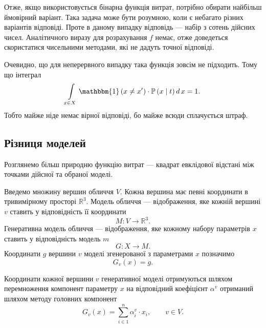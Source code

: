 Отже, якщо використовується бінарна функція витрат,
потрібно обирати найбільш ймовірний варіант.
Така задача може бути розумною, коли є небагато різних варіантів відповіді.
Проте в даному випадку відповідь --- набір з сотень дійсних чисел.
Аналітичного виразу для розрахування $f$ немає,
отже доведеться скористатися чисельними методами,
які не дадуть точної відповіді.

Очевидно,
що для неперервного випадку така функція зовсім не підходить.
Тому що інтеграл
\begin{equation*}
  \int\limits_{x \in X} \mathbbm{1} \left( x \neq x' \right)
  \cdot \mathbb{P} \left( x \;\middle|\;  t \right) d\, x = 1.
\end{equation*}
Тобто майже ніде немає вірної відповіді, бо майже всюди сплачується штраф.

\subsection{Різниця моделей}

Розглянемо більш природню функцію витрат ---
квадрат евклідової відстані між точками дійсної та обраної моделі.

Введемо множину вершин обличчя $V$.
Кожна вершина має певні координати в тривимірному просторі $\mathbb{R}^3$.
Модель обличчя --- відображення,
яке кожній вершині $v$ ставить у відповідність її координати
\begin{equation*}
  M: V \rightarrow \mathbb{R}^3.
\end{equation*}
Генеративна модель обличчя --- відображення,
яке кожному набору параметрів $x$ ставить у відповідність модель $m$
\begin{equation*}
  G: X \rightarrow M.
\end{equation*}
Координати $g$ вершини $v$ моделі згенерованої з параметрами $x$ позначимо
\begin{equation*}
  G_v\left( x \right) = g.
\end{equation*}

Координати кожної вершини $v$ генеративної моделі отримуються шляхом
перемноження компонент параметру $x$ на відповідний коефіцієнт $\alpha^v$
отриманий шляхом методу головних компонент
\begin{equation*}
  G_v\left( x \right) = \sum_{i \in 1}^n \alpha_i^v \cdot x_i,
  \qquad v \in V.
\end{equation*}

